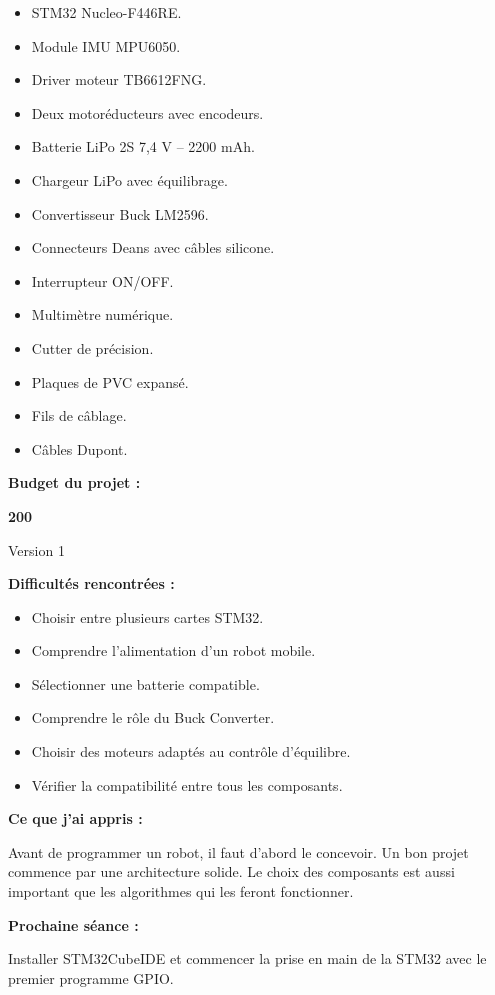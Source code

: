 \documentclass[11pt,a4paper]{article}
\begin{document}
\begin{sessionbox}
		\begin{itemize}
			\item STM32 Nucleo-F446RE.
			\item Module IMU MPU6050.
			\item Driver moteur TB6612FNG.
			\item Deux motoréducteurs avec encodeurs.
			\item Batterie LiPo 2S 7,4 V -- 2200 mAh.
			\item Chargeur LiPo avec équilibrage.
			\item Convertisseur Buck LM2596.
			\item Connecteurs Deans avec câbles silicone.
			\item Interrupteur ON/OFF.
			\item Multimètre numérique.
			\item Cutter de précision.
			\item Plaques de PVC expansé.
			\item Fils de câblage.
			\item Câbles Dupont.
		\end{itemize}
		
		\vspace{0.3cm}
		
		\textbf{Budget du projet :}
		
		\begin{center}
			\Huge
			\textbf{200~\texteuro{}}
			
			\Large
			Version 1
		\end{center}
		
		\vspace{0.3cm}
		
		\textbf{Difficultés rencontrées :}
		
		\begin{itemize}
			\item Choisir entre plusieurs cartes STM32.
			\item Comprendre l'alimentation d'un robot mobile.
			\item Sélectionner une batterie compatible.
			\item Comprendre le rôle du Buck Converter.
			\item Choisir des moteurs adaptés au contrôle d'équilibre.
			\item Vérifier la compatibilité entre tous les composants.
		\end{itemize}
		
		\vspace{0.3cm}
		
		\textbf{Ce que j'ai appris :}
		
		Avant de programmer un robot, il faut d'abord le concevoir. Un bon projet commence par une architecture solide. Le choix des composants est aussi important que les algorithmes qui les feront fonctionner.
		
		\vspace{0.3cm}
		
		\textbf{Prochaine séance :}
		
		Installer STM32CubeIDE et commencer la prise en main de la STM32 avec le premier programme GPIO.
		
	\end{sessionbox}
	
\end{document}
